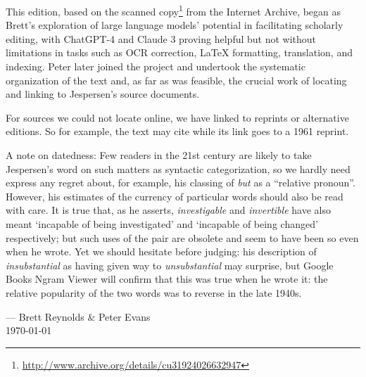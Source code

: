This edition, based on the scanned copy\footnote{\url{http://www.archive.org/details/cu31924026632947}} from the Internet Archive, began as Brett's exploration of large language models' potential in facilitating scholarly editing, with ChatGPT-4 and Claude 3 proving helpful but not without limitations in tasks such as OCR correction, {\LaTeX} formatting, translation, and indexing. Peter later joined the project and undertook the systematic organization of the text and, as far as was feasible, the crucial work of locating and linking to Jespersen’s source documents. 

For sources we could not locate online, we have linked to reprints or alternative editions. So for example, the text may cite \citep{jespersenMEG1} while its link goes to a 1961 reprint.

A note on datedness: Few readers in the 21st century are likely to take Jespersen's word on such matters as syntactic categorization, so we hardly need express any regret about, for example, his classing of \textit{but} as a ``relative pronoun''. %
However, his estimates of the currency of particular words should also be read with care. It is true that, as he asserts,  \textit{investigable} and \textit{invertible} have also meant `incapable of being investigated' and `incapable of being changed' respectively; but such uses of the pair are obsolete and seem to have been so even when he wrote. Yet we should hesitate before judging: his description of \textit{insubstantial} as having given way to \textit{unsubstantial} may surprise, but Google Books Ngram Viewer will confirm that this was true when he wrote it: the relative popularity of the two words was to reverse in the late 1940s. %

\bigskip
\hfill--- Brett Reynolds \& Peter Evans\\ \phantom{.} \hfill \today
